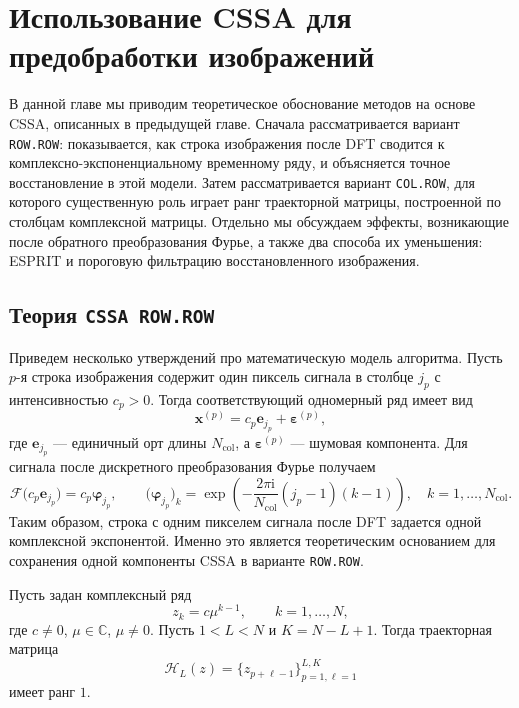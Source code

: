 ﻿%
\chapter{Использование CSSA для предобработки изображений}

В данной главе мы приводим теоретическое обоснование методов на основе CSSA,
описанных в предыдущей главе. Сначала рассматривается вариант
\texttt{ROW.ROW}: показывается, как строка изображения после DFT сводится к
комплексно-экспоненциальному временному ряду, и объясняется точное восстановление в этой модели.
Затем рассматривается вариант \texttt{COL.ROW}, для которого существенную роль играет
ранг траекторной матрицы, построенной по столбцам комплексной матрицы. Отдельно
мы обсуждаем эффекты, возникающие после обратного преобразования Фурье, а также
два способа их уменьшения: ESPRIT и пороговую фильтрацию восстановленного
изображения.


\section{Теория \texorpdfstring{\texttt{CSSA ROW.ROW}}{CSSA ROW.ROW}}

Приведем несколько утверждений про математическую модель алгоритма. Пусть
$p$-я строка изображения содержит один пиксель сигнала в столбце $j_p$ с
интенсивностью $c_p>0$. Тогда соответствующий одномерный ряд имеет вид
\[
\mathbf{x}^{(p)} = c_p \mathbf{e}_{j_p} + \boldsymbol{\varepsilon}^{(p)},
\]
где $\mathbf{e}_{j_p}$ --- единичный орт длины $N_{\mathrm{col}}$,
а $\boldsymbol{\varepsilon}^{(p)}$ --- шумовая компонента. Для сигнала
после дискретного преобразования Фурье получаем
\begin{equation}
\mathcal{F}\bigl(c_p\mathbf{e}_{j_p}\bigr)
=
c_p \boldsymbol{\varphi}_{j_p},
\qquad
\bigl(\boldsymbol{\varphi}_{j_p}\bigr)_k
=
\exp\!\left(
-\frac{2\pi\mathrm{i}}{N_{\mathrm{col}}}(j_p-1)(k-1)
\right),
\quad k=1,\dots,N_{\mathrm{col}}.
    \label{eq:one-pixel-dft-exponential}
\end{equation}
Таким образом, строка с одним пикселем сигнала после DFT задается
одной комплексной экспонентой. Именно это является теоретическим основанием
для сохранения одной компоненты CSSA в варианте \texttt{ROW.ROW}.

\begin{statement}
Пусть задан комплексный ряд
\[
z_k = c\mu^{k-1}, \qquad k=1,\dots,N,
\]
где $c \ne0$, $\mu\in\mathbb{C}$, $\mu\ne0$. Пусть $1<L<N$ и
$K=N-L+1$. Тогда траекторная матрица
\[
\mathcal{H}_L(z)
=
\{z_{p+\ell-1}\}_{p=1,\ell=1}^{L,K}
\]
имеет ранг $1$.
\end{statement}

